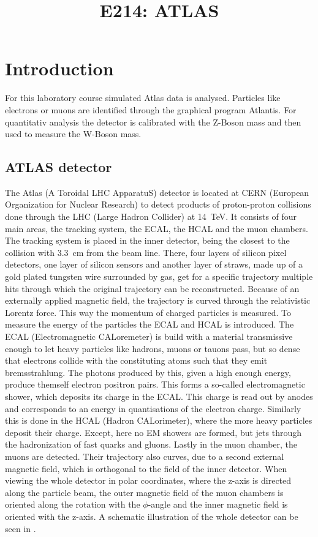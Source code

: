 \documentclass[sn-mathphys-num,icol]{sn-jnl}
\theoremstyle{thmstyleone}
\theoremstyle{thmstyletwo}
\theoremstyle{thmstylethree}
\begin{document}
\title{E214: ATLAS}
\author*[1]{ }
\author*[1]{ }
\maketitle
\section{Introduction}
For this laboratory course simulated Atlas data is analysed. Particles like electrons or muons are identified through the graphical program Atlantis. For quantitativ analysis the detector is calibrated with the Z-Boson mass and then used to measure the W-Boson mass.
\subsection{ATLAS detector}
The Atlas (A Toroidal LHC ApparatuS) detector is located at CERN (European Organization for Nuclear Research) to detect products of proton-proton collisions done through the LHC (Large Hadron Collider) at \SI{14}{TeV}\cite{cern_org}.
It consists of four main areas, the tracking system, the ECAL, the HCAL and the muon chambers. The tracking system is placed in the inner detector, being the closest to the collision with \SI{3.3}{cm} from the beam line. There, four layers of silicon pixel detectors, one layer of silicon sensors and another layer of straws, made up of a gold plated tungsten wire surrounded by gas, get for a specific trajectory multiple hits through which the original trajectory can be reconstructed.\cite{cern_org} Because of an externally applied magnetic field, the trajectory is curved through the relativistic Lorentz force. This way the momentum of charged particles is measured. To measure the energy of the particles the ECAL and HCAL is introduced. The ECAL (Electromagnetic CALoremeter) is build with a material transmissive enough to let heavy particles like hadrons, muons or tauons pass, but so dense that electrons collide with the constituting atoms such that they emit bremsstrahlung. The photons produced by this, given a high enough energy, produce themself electron positron pairs. This forms a so-called electromagnetic shower, which deposits its charge in the ECAL. This charge is read out by anodes and corresponds to an energy in quantisations of the electron charge. Similarly this is done in the HCAL (Hadron CALorimeter), where the more heavy particles deposit their charge. Except, here no EM showers are formed, but jets through the hadronization of fast quarks and gluons. Lastly in the muon chamber, the muons are detected.\cite{bonn_physics601_atlas_2025} Their trajectory also curves, due to a second external magnetic field, which is orthogonal to the field of the inner detector. When viewing the whole detector in polar coordinates, where the z-axis is directed along the particle beam, the outer magnetic field of the muon chambers is oriented along the rotation with the $\phi$-angle and the inner magnetic field is oriented with the z-axis. A schematic illustration of the whole detector can be seen in .
\end{document}
